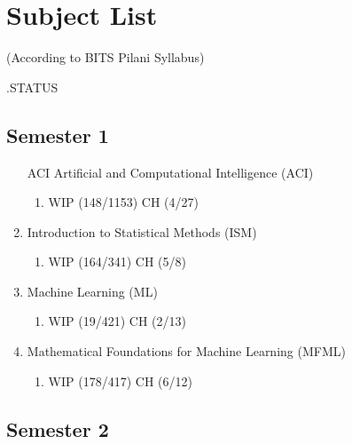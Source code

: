 \chapter*{Subject List}

\begin{center}
(According to BITS Pilani Syllabus)
\end{center}

.\hfill STATUS

\section*{Semester 1}
\begin{enumerate}
    \item[ACI] Artificial and Computational Intelligence (ACI)
        \begin{enumerate}
            \item {} 
            \hfill WIP (148/1153) CH (4/27)
        \end{enumerate}

    \item Introduction to Statistical Methods (ISM)    
        \begin{enumerate}
            \item {} 
            \hfill WIP (164/341) CH (5/8)
        \end{enumerate}

    \item Machine Learning (ML)
        \begin{enumerate}
            \item {} 
            \hfill WIP (19/421) CH (2/13)
        \end{enumerate}
        
    \item Mathematical Foundations for Machine Learning (MFML)
        \begin{enumerate}
            \item {}
            \hfill WIP (178/417) CH (6/12)
        \end{enumerate}
\end{enumerate}


\section*{Semester 2}

